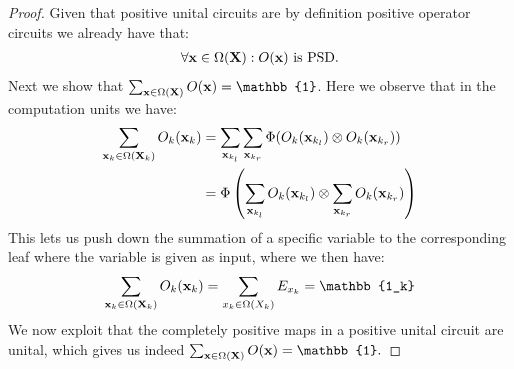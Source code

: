 \begin{proof}
	Given that positive unital circuits are by definition positive operator circuits we already have that:
	\begin{align}
		\forall \mathbf{x} \in \Omega(\mathbf{X}): O(\mathbf{x}) \text{ is PSD}.
	\end{align}
	Next we show that $\sum_{\xvars\in \Omega(\Xvars)} \Ocircuit(\xvars)=\mathbb{1}$. Here we observe that in the computation units we have:
	\begin{align}
		\sum_{\mathbf{x}_k \in \Omega(\mathbf{X}_k)} O_k(\mathbf{x}_k)
		 & = \sum_{\mathbf{x}_{k_l}} \sum_{\mathbf{x}_{k_r}}    \Phi(O_k(\mathbf{x}_{k_l}) \otimes O_k(\mathbf{x}_{k_r})  )
		\\
		 & =
		\Phi \left(
		\sum_{\mathbf{x}_{k_l}}   O_k(\mathbf{x}_{k_l})
		\otimes
		\sum_{\mathbf{x}_{k_r}}O_k(\mathbf{x}_{k_r})
		\nonumber
		\right)
	\end{align}
	This lets us push down the summation of a specific variable to the corresponding leaf where the variable is given as input, where we then have:
	\begin{align}
		\sum_{\xvars_k \in \Omega(\Xvars_k)} \Ocircuit_k(\xvars_k)
		= \sum_{\xvar_k\in \Omega(X_k)} E_{\xvar_k}
		= \mathbb{1_k}
	\end{align}
	We now exploit that the completely positive maps in a positive unital circuit are unital, which gives us indeed
	$
		\sum_{\xvars\in \Omega(\Xvars)} \Ocircuit(\xvars)=\mathbb{1}.
	$
\end{proof}
















